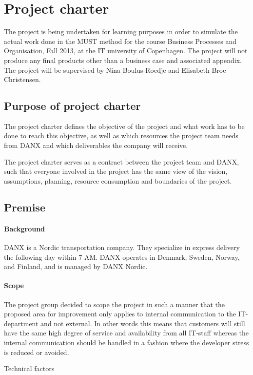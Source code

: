 \chapter{Project charter}
The project is being undertaken for learning purposes in order to simulate the actual work done in the MUST method for the course Business Processes and Organisation, Fall 2013, at the IT university of Copenhagen. The project will not produce any final products other than a business case and associated appendix. The project will be supervised by Nina Boulus-Roedje and Elisabeth Broe Christensen.

\section{Purpose of project charter}
The project charter defines the objective of the project and what work has to be done to reach this objective, as well as which resources the project team needs from DANX and which deliverables the company will receive.

The project charter serves as a contract between the project team and DANX, such that everyone involved in the project has the same view of the vision, assumptions, planning, resource consumption and boundaries of the project.


\section{Premise}
\subsubsection{Background}
DANX is a Nordic transportation company. They specialize in express delivery the following day within 7 AM. DANX operates in Denmark, Sweden, Norway, and Finland, and is managed by DANX Nordic.
 
\subsubsection{Scope}
The project group decided to scope the project in such a manner that the proposed area for improvement only applies to internal communication to the IT-department and not external. In other words this means that customers will still have the same high degree of service and availability from all IT-staff whereas the internal communication should be handled in a fashion where the developer stress is reduced or avoided. 

	Technical factors

